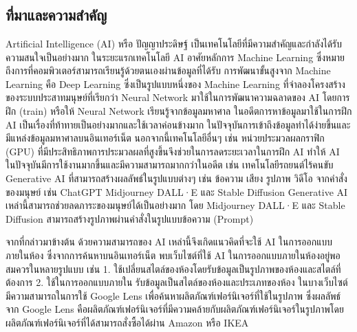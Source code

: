 \documentclass[12pt,oneside,openright,a4paper]{cpe-thai-project}
\begin{document}



\chapter{}
\section{ที่มาและความสำคัญ}
\hspace {18pt}Artificial Intelligence (AI) หรือ ปัญญาประดิษฐ์ เป็นเทคโนโลยีที่มีความสำคัญและกำลังได้รับความสนใจเป็นอย่างมาก ในระยะแรกเทคโนโลยี AI อาศัยหลักการ Machine Learning ซึ่งหมายถึงการที่คอมพิวเตอร์สามารถเรียนรู้ด้วยตนเองผ่านข้อมูลที่ได้รับ การพัฒนาขั้นสูงจาก Machine Learning คือ Deep Learning ซึ่งเป็นรูปแบบหนึ่งของ Machine Learning ที่จำลองโครงสร้างของระบบประสาทมนุษย์ที่เรียกว่า Neural Network มาใช้ในการพัฒนาความฉลาดของ AI โดยการฝึก (train) หรือให้ Neural Network เรียนรู้จากข้อมูลมหาศาล ในอดีตการหาข้อมูลมาใช้ในการฝึก AI เป็นเรื่องที่ท้าทายเป็นอย่างมากและใช้เวลาค่อนข้างมาก ในปัจจุบันการเข้าถึงข้อมูลทำได้ง่ายขึ้นและมีแหล่งข้อมูลมหาศาลบนอินเทอร์เน็ต นอกจากนี้เทคโนโลยีอื่นๆ เช่น หน่วยประมวลผลกราฟิก (GPU) ที่มีประสิทธิภาพการประมวลผลที่สูงขึ้นจึงช่วยในการลดระยะเวลาในการฝึก AI ทำให้ AI ในปัจจุบันมีการใช้งานมากขึ้นและมีความสามารถมากกว่าในอดีต เช่น เทคโนโลยีรถยนต์ไร้คนขับ Generative AI ที่สามารถสร้างผลลัพธ์ในรูปแบบต่างๆ เช่น ข้อความ เสียง รูปภาพ วิดีโอ จากคำสั่งของมนุษย์ เช่น ChatGPT Midjourney DALL·E และ Stable Diffusion Generative AI เหล่านี้สามารถช่วยลดภาระของมนุษย์ได้เป็นอย่างมาก โดย Midjourney DALL·E และ Stable Diffusion สามารถสร้างรูปภาพผ่านคำสั่งในรูปแบบข้อความ (Prompt)
\par \hspace {18pt}
จากที่กล่าวมาข้างต้น ด้วยความสามารถของ AI เหล่านี้จึงเกิดแนวคิดที่จะใช้ AI ในการออกแบบภายในห้อง ซึ่งจากการค้นหาบนอินเทอร์เน็ต พบเว็บไซต์ที่ใช้ AI ในการออกแบบภายในห้องอยู่พอสมควรในหลายรูปแบบ เช่น 1. ใช้เปลี่ยนสไตล์ของห้องโดยรับข้อมูลเป็นรูปภาพของห้องและสไตล์ที่ต้องการ 2. ใช้ในการออกแบบภายใน รับข้อมูลเป็นสไตล์ของห้องและประเภทของห้อง ในบางเว็บไซต์มีความสามารถในการใช้ Google Lens เพื่อค้นหาผลิตภัณฑ์เฟอร์นิเจอร์ที่ใช้ในรูปภาพ ซึ่งผลลัพธ์จาก Google Lens คือผลิตภัณฑ์เฟอร์นิเจอร์ที่มีความคล้ายกับผลิตภัณฑ์เฟอร์นิเจอร์ในรูปภาพโดยผลิตภัณฑ์เฟอร์นิเจอร์ที่ได้สามารถสั่งซื้อได้ผ่าน Amazon หรือ IKEA
\end{document}
